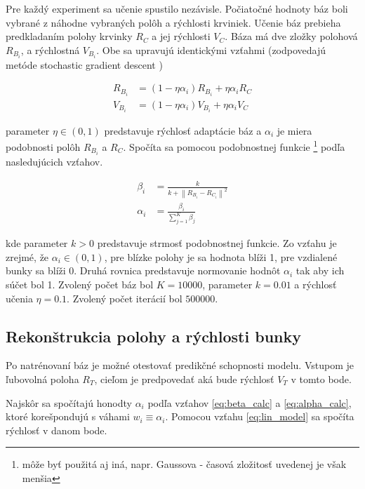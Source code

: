 \documentclass[10pt,a4paper]{article}
\begin{document}
Pre každý experiment sa učenie spustilo nezávisle.
Počiatočné hodnoty báz boli vybrané z náhodne vybraných polôh a rýchlosti krviniek.
Učenie báz prebieha predkladaním polohy krvinky $R_{C}$ a jej rýchlosti $V_{C}$.
Báza má dve zložky polohová $R_{B_i}$, a rýchlostná $V_{B_i}$.
Obe sa upravujú identickými vzťahmi (zodpovedajú metóde stochastic gradient descent \cite{bib:gradient_descent})

\begin{align}
  R_{B_i} &= (1 - \eta\alpha_i)R_{B_i} + \eta\alpha_i R_{C} \\
  V_{B_i} &= (1 - \eta\alpha_i)V_{B_i} + \eta\alpha_i V_{C}
  \label{eq:weight_learn}
\end{align}

parameter $\eta \in (0, 1)$ predstavuje rýchlosť adaptácie báz a $\alpha_i$ je miera podobnosti
polôh $R_{B_i}$ a $R_{C}$. Spočíta sa pomocou podobnostnej funkcie \footnote{môže byť použitá aj iná,
napr. Gaussova - časová zložitosť uvedenej je však menšia}
podľa nasledujúcich vzťahov.



\begin{align}
  \beta_i &=  \frac{k}{k + \left\lVert R_{B_i} - R_{C_i} \right\rVert^2} \label{eq:beta_calc} \\
  \alpha_i &= \frac{\beta_i}{\sum_{j=1}^{K}\beta_j} \label{eq:alpha_calc}
\end{align}

kde parameter $k > 0$ predstavuje strmosť podobnostnej funkcie. Zo vzťahu je zrejmé,
že $\alpha_i \in (0, 1)$, pre blízke polohy je sa hodnota blíži 1, pre vzdialené bunky sa blíži 0.
Druhá rovnica predstavuje normovanie hodnôt $\alpha_i$ tak aby ich súčet bol 1.
Zvolený počet báz bol $K = 10000$, parameter $k = 0.01$ a rýchlosť učenia $\eta = 0.1$. Zvolený počet
iterácií bol $500 000$.



\subsection{Rekonštrukcia polohy a rýchlosti bunky}

Po natrénovaní báz je možné otestovať predikčné schopnosti modelu.
Vstupom je ľubovolná poloha $R_{T}$, cieľom je predpovedať aká bude rýchlosť $V_{T}$ v tomto bode.

Najskôr sa spočítajú honodty $\alpha_i$ podľa vzťahov \ref{eq:beta_calc} a \ref{eq:alpha_calc}, ktoré korešpondujú s váhami $w_i \equiv \alpha_i$.
Pomocou vzťahu \ref{eq:lin_model} sa spočíta rýchlosť v danom bode.
\end{document}
